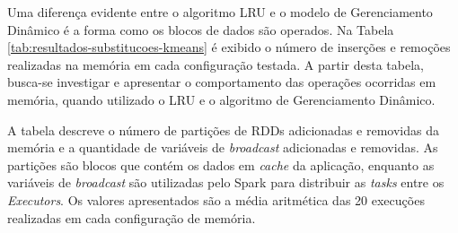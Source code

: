 Uma diferença evidente entre o algoritmo LRU e o modelo de Gerenciamento Dinâmico é a forma como os blocos de dados são operados. Na Tabela \ref{tab:resultados-substitucoes-kmeans} é exibido o número de inserções e remoções realizadas na memória em cada configuração testada. A partir desta tabela, busca-se investigar e apresentar o comportamento das operações ocorridas em memória, quando utilizado o LRU e o algoritmo de Gerenciamento Dinâmico.

A tabela descreve o número de partições de RDDs adicionadas e removidas da memória e a quantidade de variáveis de \textit{broadcast} adicionadas e removidas. As partições são blocos que contém os dados em \textit{cache} da aplicação, enquanto as variáveis de \textit{broadcast} são utilizadas pelo Spark para distribuir as \textit{tasks} entre os \textit{Executors}. Os valores apresentados são a média aritmética das 20 execuções realizadas em cada configuração de memória.

